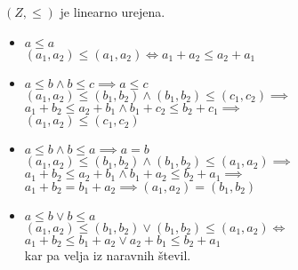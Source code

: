 \begin{trditev}
    $(Z, \leq)$ je linearno urejena.
\end{trditev}
\begin{dokaz}
    \begin{itemize}
        \item $a \leq a$ \\
        $(a_1, a_2) \leq (a_1, a_2) \iff a_1 + a_2 \leq a_2 + a_1$
        \item $a \leq b \wedge b \leq c \implies a \leq c$ \\
        $(a_1, a_2) \leq (b_1, b_2) \wedge (b_1, b_2) \leq (c_1, c_2) \implies$\\
        $a_1 + b_2 \leq a_2 + b_1 \wedge b_1 + c_2 \leq b_2 + c_1 \implies$\\
        $(a_1, a_2) \leq (c_1, c_2)$
        \item $a \leq b \wedge b \leq a \implies a = b$ \\
        $(a_1, a_2) \leq (b_1, b_2) \wedge (b_1, b_2) \leq (a_1, a_2) \implies$ \\
        $a_1 + b_2 \leq a_2 + b_1 \wedge b_1 + a_2 \leq b_2 + a_1 \implies$ \\
        $a_1 + b_2 = b_1 + a_2 \implies (a_1, a_2) = (b_1, b_2)$
        \item $a \leq b \vee b \leq a$ \\
        $(a_1, a_2) \leq (b_1, b_2) \vee (b_1, b_2) \leq (a_1, a_2) \iff$
        $a_1 + b_2 \leq b_1 + a_2 \vee a_2 + b_1 \leq b_2 + a_1$ \\
        kar pa velja iz naravnih števil.
    \end{itemize}
\end{dokaz}